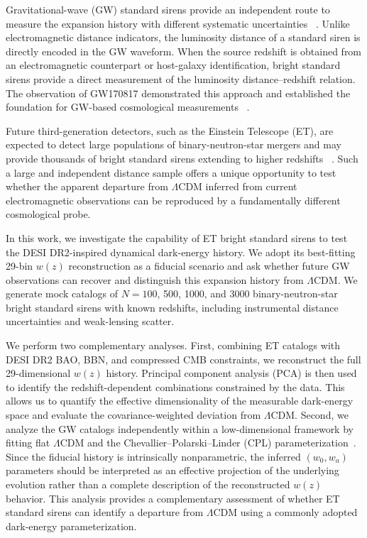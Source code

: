 \documentclass[
  aps,
  prd,
  twocolumn,
  nofootinbib,
  superscriptaddress,
  floatfix,
  longbibliography
]{revtex4-2}
\begin{document}
Gravitational-wave (GW) standard sirens provide an independent route to
measure the expansion history with different systematic uncertainties
~\cite{Schutz1986,HolzHughes2005}. Unlike electromagnetic distance indicators,
the luminosity distance of a standard siren is directly encoded in the GW
waveform. When the source redshift is obtained from an electromagnetic
counterpart or host-galaxy identification, bright standard sirens provide a
direct measurement of the luminosity distance--redshift relation.
The observation of GW170817 demonstrated this approach and established the
foundation for GW-based cosmological measurements
~\cite{Abbott2017GW170817,Abbott2017StandardSiren}.

Future third-generation detectors, such as the Einstein Telescope (ET), are
expected to detect large populations of binary-neutron-star mergers and may
provide thousands of bright standard sirens extending to higher redshifts
~\cite{Zhao2011,ETDesign,Branchesi2023}. Such a large and independent
distance sample offers a unique opportunity to test whether the apparent
departure from $\Lambda$CDM inferred from current electromagnetic observations
can be reproduced by a fundamentally different cosmological probe.

In this work, we investigate the capability of ET bright standard sirens to
test the DESI DR2-inspired dynamical dark-energy history. We
adopt its best-fitting 29-bin $w(z)$ reconstruction as a fiducial scenario and
ask whether future GW observations can recover and distinguish this expansion
history from $\Lambda$CDM. We generate mock catalogs of
$N=100$, 500, 1000, and 3000 binary-neutron-star bright standard sirens with
known redshifts, including instrumental distance uncertainties and weak-lensing
scatter.

We perform two complementary analyses. First, combining ET catalogs with DESI
DR2 BAO, BBN, and compressed CMB constraints, we reconstruct the full
29-dimensional $w(z)$ history. Principal component analysis (PCA) is then used
to identify the redshift-dependent combinations constrained by the data. This
allows us to quantify the effective dimensionality of the measurable dark-energy
space and evaluate the covariance-weighted deviation from $\Lambda$CDM.
Second, we analyze the GW catalogs independently within a low-dimensional
framework by fitting flat $\Lambda$CDM and the Chevallier--Polarski--Linder
(CPL) parameterization~\cite{Chevallier2001,Linder2003}. Since the fiducial
history is intrinsically nonparametric, the inferred $(w_0,w_a)$ parameters
should be interpreted as an effective projection of the underlying evolution
rather than a complete description of the reconstructed $w(z)$ behavior. This
analysis provides a complementary assessment of whether ET standard sirens can
identify a departure from $\Lambda$CDM using a commonly adopted dark-energy
parameterization.
\end{document}
